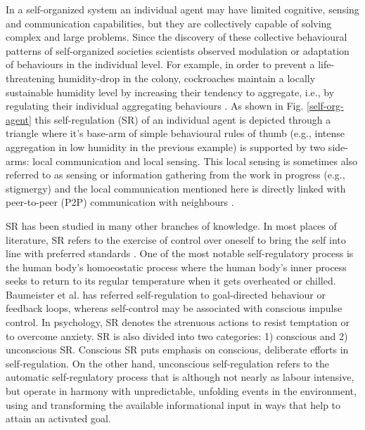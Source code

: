 In a self-organized system an individual agent may have limited cognitive, sensing and communication capabilities, but they are collectively capable of solving complex and large problems.  Since the discovery of these collective behavioural patterns of self-organized  societies scientists observed modulation or adaptation of behaviours in the individual level. For example, in order to prevent a life-threatening humidity-drop in the colony, cockroaches maintain a locally sustainable humidity level by increasing their tendency to aggregate, i.e., by regulating their individual aggregating behaviours \cite{Garnier+2007}. As shown in Fig. \ref{self-org-agent} this  self-regulation (SR) of an individual agent is depicted through a triangle where it's base-arm of simple behavioural rules of thumb (e.g., intense aggregation in low humidity in the previous example) is supported by two side-arms: local communication and local sensing. This local sensing is sometimes also referred to as sensing or information gathering from the work in progress (e.g., stigmergy) and the local communication mentioned here is directly linked with peer-to-peer (P2P) communication with neighbours  \cite{Camazine+2001}.

SR has been studied in many other branches of knowledge. In most places of literature, SR refers to the exercise of control over oneself to bring the self into line with preferred standards \cite{Baumeister+2007}. One of the most notable self-regulatory process is the human body's homoeostatic process where the human body's inner process seeks to return to its regular temperature when it gets overheated or chilled. Baumeister et al. has referred self-regulation to goal-directed behaviour or feedback loops, whereas self-control may be associated with conscious impulse control.  In psychology, SR denotes the strenuous actions to resist temptation or to overcome anxiety. SR is also divided into two categories: 1) conscious and 2) unconscious SR. Conscious SR puts emphasis on conscious, deliberate efforts in self-regulation. On the other hand, unconscious self-regulation refers to the automatic self-regulatory process that is although not nearly as labour intensive, but operate in harmony with unpredictable, unfolding events in the environment, using and transforming the available informational input in ways that help to attain an activated goal.

